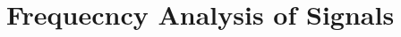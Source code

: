 \documentclass[../course]{subfiles}
\begin{document}
\ifSubfilesClassLoaded {
    
} {
    \chapter{Frequecncy Analysis of Signals} \label{chp:wrkFrequencyAnalysis}
}












\end{document}
